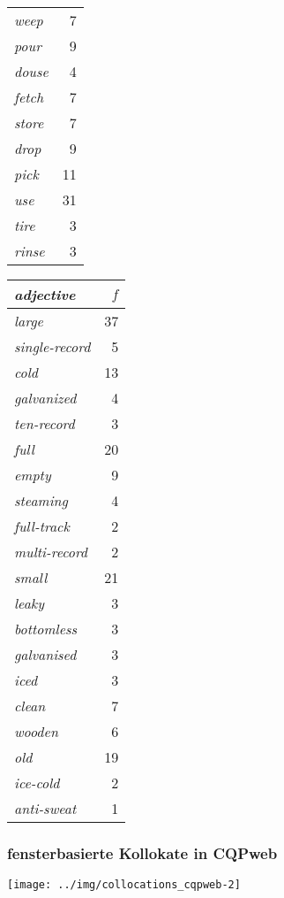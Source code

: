 \documentclass[aspectratio=1610,t]{beamer} %
\begin{document}
\begin{frame}
\begin{center}
\begin{scriptsize}
\begin{tabular}{>{\itshape}lr}
       weep &  7 \\
       pour &  9 \\
      douse &  4 \\
      fetch &  7 \\
      store &  7 \\
       drop &  9 \\
       pick & 11 \\
        use & 31 \\
       tire &  3 \\
      rinse &  3 \\
        \bottomrule
      \end{tabular}
      \hspace{5mm}
      \begin{tabular}{>{\itshape}lr}
        \toprule
        \textbf{adjective} & $f$ \\
        \midrule
          large & 37 \\
  single-record &  5 \\
           cold & 13 \\
     galvanized &  4 \\
     ten-record &  3 \\
           full & 20 \\
          empty &  9 \\
       steaming &  4 \\
     full-track &  2 \\
   multi-record &  2 \\
          small & 21 \\
          leaky &  3 \\
     bottomless &  3 \\
     galvanised &  3 \\
           iced &  3 \\
          clean &  7 \\
         wooden &  6 \\
            old & 19 \\
       ice-cold &  2 \\
     anti-sweat &  1 \\
        \bottomrule
      \end{tabular}
    \end{scriptsize}
  \end{center}
\end{frame}

\begin{frame}[c]
  \frametitle{fensterbasierte Kollokate in CQPweb}
  \begin{center}
    \texttt{[image: ../img/collocations\_cqpweb-2]}
  \end{center}
\end{frame}
\end{document}
